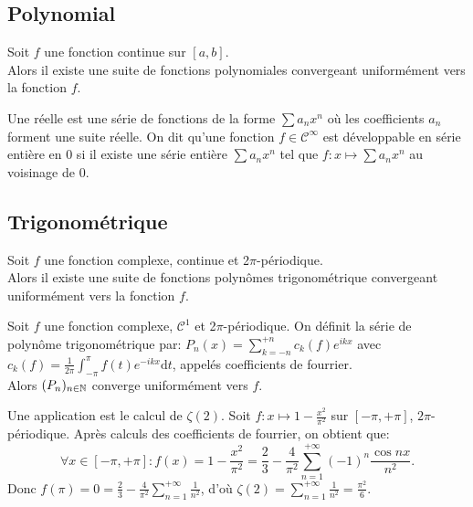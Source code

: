 \documentclass{book}
\begin{document}
\subsection{Polynomial}
%
\begin{Theoreme}Soit $f$ une fonction continue sur $[a,b]$.\\
Alors il existe une suite de fonctions polynomiales convergeant uniformément vers la fonction $f$.
\end{Theoreme}
\begin{Definition}
 Une  réelle est une série de fonctions de la forme $\sum a_{n}x^{n}$ 
où les coefficients $a_n$ forment une suite réelle. On dit qu'une fonction $f\in \mathcal{C}^\infty$ est développable en série entière en $0$ si il existe une série entière $\sum a_{n}x^{n}$ tel que $f:x\mapsto\sum a_{n}x^{n}$ au voisinage de $0$.  
\end{Definition}


\subsection{Trigonométrique}
\begin{Theoreme}
Soit $f$ une fonction complexe, continue et 2$\pi$-périodique.\\
Alors il existe une suite de fonctions polynômes trigonométrique  convergeant uniformément vers la fonction $f$.
\end{Theoreme}
\begin{Theoreme}
Soit $f$ une fonction complexe, $\mathcal{C}^1$ et 2$\pi$-périodique. On définit la série 
de polynôme trigonométrique par:
$ P_n(x)=\sum _{k=-n}^{+n}  c_{k}(f) e^{ikx}$ avec $c_{k}(f)={\frac {1}{2\pi}}\int _{-\pi}^{\pi}f(t)e^{-ikx}\mathrm {d} t$, appelés coefficients de fourrier.\\
Alors $(P_n)_{n\in\mathbb{N}}$ converge uniformément vers $f$.
\end{Theoreme}
Une application est le calcul de $\zeta(2)$. Soit $f:x\mapsto 1-\frac{x^2}{\pi^2}$ sur $[-\pi,+\pi]$, $2\pi$-périodique. Après calculs des coefficients de fourrier, on obtient que:
$$\forall x\in [-\pi,+\pi] :f(x)=  1-\frac{x^2}{\pi^2}=\frac{2}{3}-\frac{4}{\pi^2} \sum _{n=1}^{+\infty}(-1)^n \frac{\cos nx}{n^2}.$$
Donc $f(\pi)=0=\frac{2}{3}-\frac{4}{\pi^2} \sum _{n=1}^{+\infty}\frac{1}{n^2}$, d'où $\zeta(2)=\sum _{n=1}^{+\infty}\frac{1}{n^2}=\frac{\pi^2}{6}$.
\end{document}
